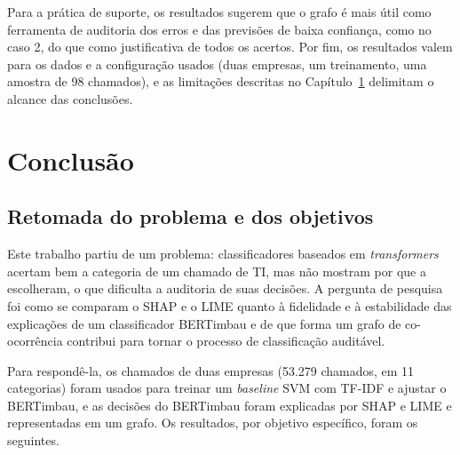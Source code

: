 \documentclass[
    12pt,                %
    openright,           %
    oneside,             %
    a4paper,             %
    english,             %
    brazil               %
]{abntex2}
\begin{document}
Para a prática de suporte, os resultados sugerem que o grafo é mais útil como ferramenta de auditoria dos erros e das previsões de baixa confiança, como no caso 2, do que como justificativa de todos os acertos. Por fim, os resultados valem para os dados e a configuração usados (duas empresas, um treinamento, uma amostra de 98 chamados), e as limitações descritas no Capítulo~\ref{cap:conclusao} delimitam o alcance das conclusões.

\chapter{Conclusão}
\label{cap:conclusao}

\section{Retomada do problema e dos objetivos}
Este trabalho partiu de um problema: classificadores baseados em \textit{transformers} acertam bem a categoria de um chamado de TI, mas não mostram por que a escolheram, o que dificulta a auditoria de suas decisões. A pergunta de pesquisa foi como se comparam o SHAP e o LIME quanto à fidelidade e à estabilidade das explicações de um classificador BERTimbau e de que forma um grafo de co-ocorrência contribui para tornar o processo de classificação auditável.

Para respondê-la, os chamados de duas empresas (53.279 chamados, em 11 categorias) foram usados para treinar um \textit{baseline} SVM com TF-IDF e ajustar o BERTimbau, e as decisões do BERTimbau foram explicadas por SHAP e LIME e representadas em um grafo. Os resultados, por objetivo específico, foram os seguintes.
\end{document}
